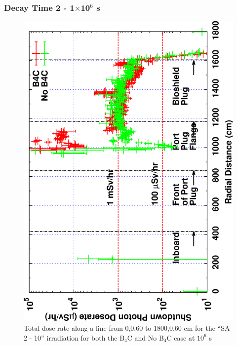 \documentclass[12pt]{article}
\begin{document}
\subsubsection{Decay Time 2 - 1$\times$10$^{6}$ s}
\begin{figure}[ht!]
\centering
\includegraphics[clip,scale=0.12,angle=-90]{../plots/photon_lineout/comp/5yr_dc2.png}
\caption{Total dose rate along a line from 0,0,60 to 1800,0,60 cm for the ``SA-2 - 10'' irradiation
for both the B$_4$C and No B$_4$C case at $10^6$ s}
\label{fig:photons_5y_dc2_dose}
\end{figure}
\end{document}
